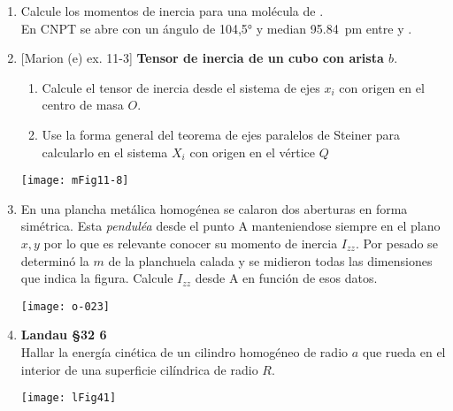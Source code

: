 \documentclass[11pt, spanish, a4paper, twoside]{article}
\begin{document}
\begin{enumerate}
	\item Calcule los momentos de inercia para una molécula de .\\
		En CNPT se abre con un ángulo de \ang{104,5;;} y median \SI{95.84}{\pico\metre} entre  y .



	\item 
		\begin{minipage}[t][3.7cm]{0.6\textwidth}
			[Marion (e) ex. 11-3] \textbf{Tensor de inercia de un cubo con arista \(b\)}.
				\begin{enumerate}
					\item Calcule el tensor de inercia desde el sistema de ejes \(x_i\) con origen en el centro de masa \(O\).
					\item Use la forma general del teorema de ejes paralelos de Steiner para calcularlo en el sistema \(X_i\) con origen en el vértice \(Q\) 
				\end{enumerate}
			\end{minipage}
			\begin{minipage}[c][1.2cm][t]{0.35\textwidth}
				\texttt{[image: mFig11-8]}
			\end{minipage}


		\item 
			\begin{minipage}[t][3.5cm]{0.5\textwidth}
				En una plancha metálica homogénea se calaron dos aberturas en forma simétrica.
				Esta \emph{penduléa} desde el punto A manteniendose siempre en el plano \(x,y\) por lo que es relevante conocer su momento de inercia \(I_{zz}\).
				Por pesado se determinó la $m$ de la planchuela calada y se midieron todas las dimensiones que indica la figura.
				Calcule \(I_{zz}\) desde A en función de esos datos.
			\end{minipage}
			\begin{minipage}[c][1.5cm][t]{0.45\textwidth}
				\texttt{[image: o-023]}
			\end{minipage}


		\item 
			\begin{minipage}[t][1.3cm]{0.65\textwidth}
				\textbf{Landau \S 32 6}\\%
				Hallar la energía cinética de un cilindro homogéneo de radio \(a\) que rueda en el interior de una superficie cilíndrica de radio \(R\).
			\end{minipage}
			\begin{minipage}[c][1.5cm][t]{0.3\textwidth}
				\texttt{[image: lFig41]}
			\end{minipage}




\end{enumerate}
\end{document}
